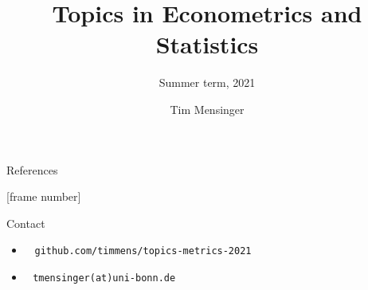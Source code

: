 \documentclass[serif, mathsansserif, aspectratio=169]{beamer}   %
\title{Topics in Econometrics and Statistics}
\subtitle{Summer term, 2021}
\author{Tim Mensinger}
\institute{University of Bonn}
\date{}
\begin{document}
\begin{frame}
    \maketitle
\end{frame}

\begin{frame}
  \tableofcontents
\end{frame}









\begin{frame}{References}
    \nocite{*}
    \printbibliography
\end{frame}

[frame number]{}  %
\begin{frame}{Contact}
    \begin{itemize}
        \item[] \large {} \,\,\, \texttt{github.com/timmens/topics-metrics-2021}
        \item[] \large {} \,\, \texttt{tmensinger(at)uni-bonn.de}
    \end{itemize}
\end{frame}
\end{document}
